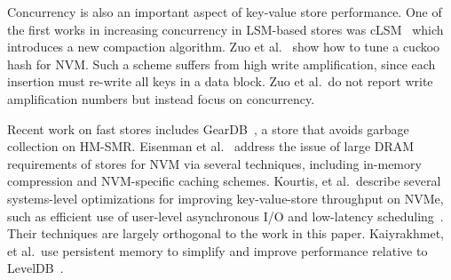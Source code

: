 Concurrency is also an important aspect of key-value store
performance. One of the first works in increasing concurrency in
LSM-based stores was cLSM~\cite{golan2015scaling} which introduces a
new compaction algorithm.  Zuo et al.~\cite{!hashing:index:persistent}
show how to tune a cuckoo hash for NVM.  Such a scheme suffers from
high write amplification, since each insertion must re-write all keys
in a data block.  Zuo et al.~do not report write amplification numbers
but instead focus on concurrency.

Recent work on fast \kv stores includes GearDB~\cite{!geardb}, a \kv
store that avoids garbage collection on HM-SMR.  Eisenman et
al.~\cite{!nvm:facebook} address the issue of large DRAM requirements
of \kv stores for NVM via several techniques, including in-memory
compression and NVM-specific caching schemes.  Kourtis, et
al.~describe several systems-level optimizations for improving
key-value-store throughput on NVMe, such as efficient use of
user-level asynchronous I/O and low-latency
scheduling~\cite{KourtisIoKo19}.  Their techniques are largely
orthogonal to the work in this paper.  Kaiyrakhmet, et al.~use
persistent memory to simplify and improve performance relative to
LevelDB~\cite{KaiyrakhmetLeNa19}.

